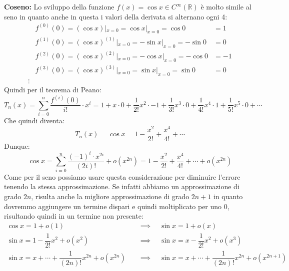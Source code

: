 \textbf{Coseno:} Lo sviluppo della funzione $f(x) = \cos{x} \in C^\infty(
\mathbb{R})$ è molto simile al seno in quanto anche in questa i valori della 
derivata si alternano ogni 4:
\begin{align*}
	&f^{(0)}(0) = (\cos{x}) |_{x = 0} = \cos{x} |_{x = 0} = \cos{0} &= 1\\[5pt]
	&f^{(1)}(0) = (\cos{x})^{(1)}|_{x = 0} = -\sin{x} |_{x = 0} = -\sin{0} 
    &= 0\\[5pt]
	&f^{(2)}(0) = (\cos{x})^{(2)} |_{x = 0} = -\cos{x} |_{x = 0} = -\cos{0} 
    &= -1\\[5pt]
	&f^{(3)}(0) = (\cos{x})^{(3)} |_{x = 0} = \sin{x} |_{x = 0} = \sin{0} 
    &= 0\\
	\vdots
\end{align*}
Quindi per il teorema di Peano:
\begin{equation*}
	T_n(x) = \sum \limits_{i = 0}^n \dfrac{f^{(i)}(0)}{i!} \cdot x^i = 1 + x 
    \cdot 0 + \dfrac{1}{2!}x^2 \cdot -1 + \dfrac{1}{3!}x^3 \cdot 0 + 
    \dfrac{1}{4!}x^4 \cdot 1 + \dfrac{1}{5!}x^5 \cdot 0 + \cdots 
\end{equation*}
Che quindi diventa:
\begin{equation*}
	T_n(x) = \cos{x} = 1 - \dfrac{x^2}{2!} + \dfrac{x^4}{4!} + \cdots
\end{equation*}
Dunque:
\begin{equation*}
	\cos{x} = \sum \limits_{i = 0}^n \dfrac{(-1)^i \cdot x^{2i}}{(2i)!} + 
    o(x^{2n}) = 1 - \dfrac{x^2}{2!} + \dfrac{x^4}{4!} + \cdots + o(x^{2n})
\end{equation*}
Come per il seno possiamo usare questa considerazione per diminuire l'errore 
tenendo la stessa approssimazione. Se infatti abbiamo un approssimazione di 
grado $2n$, risulta anche la migliore approssimazione di grado $2n + 1$ in 
quanto dovremmo aggiungere un termine dispari e quindi moltiplicato per uno 0, 
risultando quindi in un termine non presente:
\begin{align*}
	\cos{x} = 1 + o(1) \quad &\implies \quad \sin{x} = 1 + o(x)\\[5pt]
	\sin{x} = 1 - \dfrac{1}{2!}x^2 + o(x^2) \quad &\implies \quad \sin{x} = x - 
    \dfrac{1}{2!}x^2 + o(x^3) \\[5pt]
	\sin{x} = x + \cdots + \dfrac{1}{(2n)!} x^{2n} + o(x^{2n}) \quad &\implies 
    \quad \sin{x} = x + \cdots + \dfrac{1}{(2n)!} x^{2n} + o(x^{2n+1})
\end{align*}




